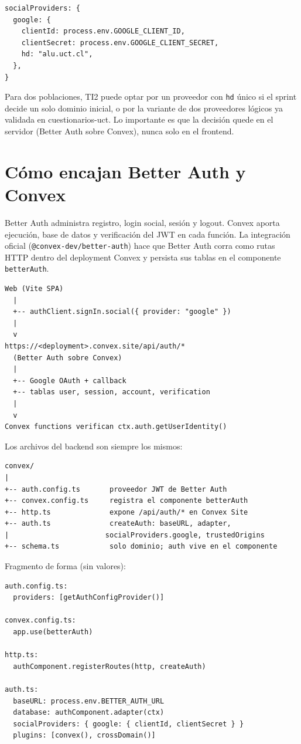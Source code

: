 \documentclass[11pt,a4paper]{article}
\begin{document}
\begin{lstlisting}
socialProviders: {
  google: {
    clientId: process.env.GOOGLE_CLIENT_ID,
    clientSecret: process.env.GOOGLE_CLIENT_SECRET,
    hd: "alu.uct.cl",
  },
}
\end{lstlisting}

Para dos poblaciones, TI2 puede optar por un proveedor con \texttt{hd} único
si el sprint decide un solo dominio inicial, o por la variante de dos
proveedores lógicos ya validada en cuestionarios-uct. Lo importante es que la
decisión quede en el servidor (Better Auth sobre Convex), nunca solo en el
frontend.

\section{Cómo encajan Better Auth y Convex}

Better Auth administra registro, login social, sesión y logout. Convex aporta
ejecución, base de datos y verificación del JWT en cada función. La
integración oficial (\texttt{@convex-dev/better-auth}) hace que Better Auth
corra como rutas HTTP dentro del deployment Convex y persista sus tablas en
el componente \texttt{betterAuth}.

\begin{lstlisting}
Web (Vite SPA)
  |
  +-- authClient.signIn.social({ provider: "google" })
  |
  v
https://<deployment>.convex.site/api/auth/*
  (Better Auth sobre Convex)
  |
  +-- Google OAuth + callback
  +-- tablas user, session, account, verification
  |
  v
Convex functions verifican ctx.auth.getUserIdentity()
\end{lstlisting}

Los archivos del backend son siempre los mismos:

\begin{lstlisting}
convex/
|
+-- auth.config.ts       proveedor JWT de Better Auth
+-- convex.config.ts     registra el componente betterAuth
+-- http.ts              expone /api/auth/* en Convex Site
+-- auth.ts              createAuth: baseURL, adapter,
|                       socialProviders.google, trustedOrigins
+-- schema.ts            solo dominio; auth vive en el componente
\end{lstlisting}

Fragmento de forma (sin valores):

\begin{lstlisting}
auth.config.ts:
  providers: [getAuthConfigProvider()]

convex.config.ts:
  app.use(betterAuth)

http.ts:
  authComponent.registerRoutes(http, createAuth)

auth.ts:
  baseURL: process.env.BETTER_AUTH_URL
  database: authComponent.adapter(ctx)
  socialProviders: { google: { clientId, clientSecret } }
  plugins: [convex(), crossDomain()]
\end{lstlisting}
\end{document}
